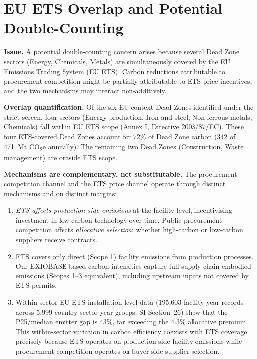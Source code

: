 \documentclass[11pt]{article}
\begin{document}
\section{EU ETS Overlap and Potential Double-Counting}
\label{sec:ets_overlap}

\textbf{Issue.} A potential double-counting concern arises because several Dead Zone sectors (Energy, Chemicals, Metals) are simultaneously covered by the EU Emissions Trading System (EU ETS). Carbon reductions attributable to procurement competition might be partially attributable to ETS price incentives, and the two mechanisms may interact non-additively.

\textbf{Overlap quantification.} Of the six EU-context Dead Zones identified under the strict screen, four sectors (Energy production, Iron and steel, Non-ferrous metals, Chemicals) fall within EU ETS scope (Annex I, Directive 2003/87/EC). These four ETS-covered Dead Zones account for 72\% of Dead Zone carbon (342 of 471~Mt CO\textsubscript{2}e annually). The remaining two Dead Zones (Construction, Waste management) are outside ETS scope.

\textbf{Mechanisms are complementary, not substitutable.} The procurement competition channel and the ETS price channel operate through distinct mechanisms and on distinct margins:
\begin{enumerate}
\item \textit{ETS affects production-side emissions} at the facility level, incentivising investment in low-carbon technology over time. Public procurement competition affects \textit{allocative selection}: whether high-carbon or low-carbon suppliers receive contracts.
\item ETS covers only direct (Scope 1) facility emissions from production processes. Our EXIOBASE-based carbon intensities capture full supply-chain embodied emissions (Scopes 1--3 equivalent), including upstream inputs not covered by ETS permits.
\item Within-sector EU ETS installation-level data (195,603 facility-year records across 5,999 country-sector-year groups; SI Section~26) show that the P25/median emitter gap is 43\%, far exceeding the 4.3\% allocative premium. This within-sector variation in carbon efficiency coexists with ETS coverage precisely because ETS operates on production-side facility emissions while procurement competition operates on buyer-side supplier selection.
\end{enumerate}
\end{document}
